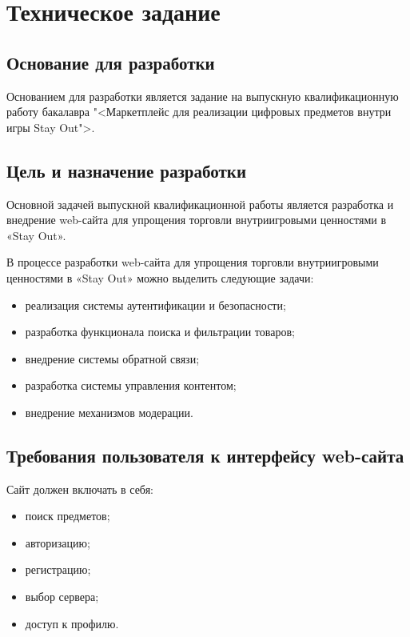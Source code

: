 \section{Техническое задание}
\subsection{Основание для разработки}

Основанием для разработки является задание на выпускную квалификационную работу бакалавра "<Маркетплейс для реализации цифровых предметов внутри игры \textquotedbl Stay Out\textquotedbl">.

\subsection{Цель и назначение разработки}

Основной задачей выпускной квалификационной работы является разработка и внедрение web-сайта для упрощения торговли внутриигровыми ценностями в «Stay Out».


В процессе разработки web-сайта для упрощения торговли внутриигровыми ценностями в «Stay Out» можно выделить следующие задачи:
\begin{itemize}
\item реализация системы аутентификации и безопасности;
\item разработка функционала поиска и фильтрации товаров;
\item внедрение системы обратной связи;
\item разработка системы управления контентом;
\item внедрение механизмов модерации.
\end{itemize}

\subsection{Требования пользователя к интерфейсу web-сайта}

Сайт должен включать в себя:
\begin{itemize}
    \item поиск предметов;
    \item авторизацию;
    \item регистрацию;
    \item выбор сервера;
    \item доступ к профилю.
\end{itemize}

